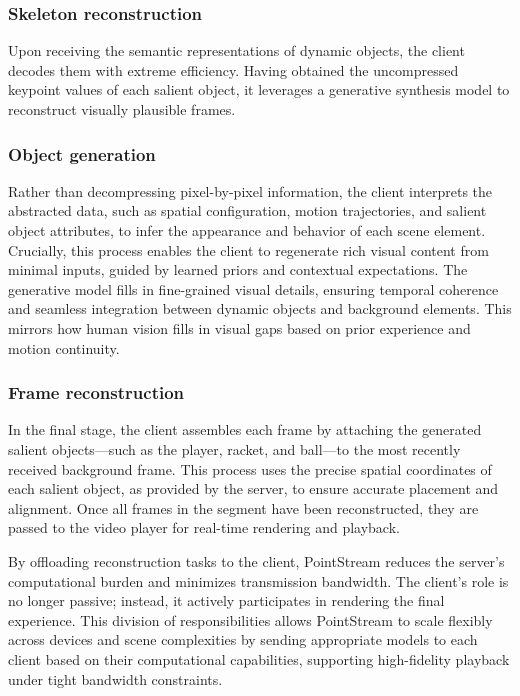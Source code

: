 \documentclass[manuscript, screen]{acmart}
\begin{document}
\subsubsection*{Skeleton reconstruction}
Upon receiving the semantic representations of dynamic objects, the client decodes them with extreme efficiency. Having obtained the uncompressed keypoint values of each salient object, it leverages a generative synthesis model to reconstruct visually plausible frames. 
\subsubsection*{Object generation}
Rather than decompressing pixel-by-pixel information, the client interprets the abstracted data, such as spatial configuration, motion trajectories, and salient object attributes, to infer the appearance and behavior of each scene element.
Crucially, this process enables the client to regenerate rich visual content from minimal inputs, guided by learned priors and contextual expectations.
The generative model fills in fine-grained visual details, ensuring temporal coherence and seamless integration between dynamic objects and background elements.
This mirrors how human vision fills in visual gaps based on prior experience and motion continuity.
\subsubsection*{Frame reconstruction}
In the final stage, the client assembles each frame by attaching the generated salient objects—such as the player, racket, and ball—to the most recently received background frame. This process uses the precise spatial coordinates of each salient object, as provided by the server, to ensure accurate placement and alignment. Once all frames in the segment have been reconstructed, they are passed to the video player for real-time rendering and playback.

By offloading reconstruction tasks to the client, PointStream reduces the server’s computational burden and minimizes transmission bandwidth. 
The client’s role is no longer passive; instead, it actively participates in rendering the final experience. 
This division of responsibilities allows PointStream to scale flexibly across devices and scene complexities by sending appropriate models to each client based on their computational capabilities, supporting high-fidelity playback under tight bandwidth constraints.

\end{document}
